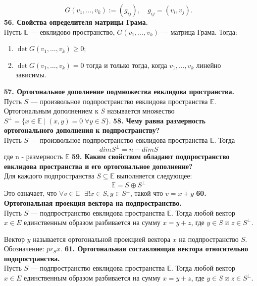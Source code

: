 \documentclass{article}
\begin{document}
	$$G(v_1,\ldots, v_k) := (g_{ij}),\quad g_{ij} = (v_i,v_j).$$
\newline
\newline
\textbf{56. Свойства определителя матрицы Грама.}\\
Пусть $\mathbb{E}$ --- евклидово пространство, $G(v_1,\ldots, v_k)$ --- матрица Грама. Тогда:
\begin{enumerate}
	\item $\det G(v_1, \ldots, v_k) \geqslant 0$;
	\item $\det G(v_1, \ldots, v_k) = 0$ тогда и только тогда, когда $v_1, \ldots, v_k$ линейно зависимы.
\end{enumerate}
\textbf{57. Ортогональное дополнение подмножества евклидова пространства.}\\
Пусть $S$ --- произвольное подпространство евклидова пространства $\mathbb{E}$. Ортогональным дополнением к $S$ называется множество $S^{\perp} = \{x\in \mathbb{E}\; |\; (x,y) = 0\;\forall y \in S\}$.
\newpage
\textbf{58. Чему равна размерность ортогонального дополнения к подпространству?}\\
Пусть $S$ --- произвольное подпространство евклидова пространства $\mathbb{E}$. Тогда
$$dimS^{\perp}=n-dimS$$
где n - размерность $\mathbb{E}$
\newline
\newline
\textbf{59. Каким свойством обладают подпространство евклидова пространства и его ортогональное дополнение?}\\
Для каждого подпространства $S \subseteq\mathbb{E}$ выполняется следующее:
$$\mathbb{E}=S\oplus S^{\perp}$$
Это означает, что $\forall v \in \mathbb{E}~~~\exists!x\in S, y \in S^{\perp}$, такой что $v = x+y$
\newline
\newline
\textbf{60. Ортогональная проекция вектора на подпространство.}\\
Пусть $S$ --- подпространство евклидова пространства $\mathbb{E}$. Тогда любой вектор $x \in E$ единственным образом разбивается на сумму $x = y + z$, где $y \in S$ и $z \in S^\perp$. 

Вектор $y$ называется ортогональной проекцией вектора $x$ на подпространство $S$. Обозначение: $pr_S x$. 
\newline
\newline
\textbf{61. Ортогональная составляющая вектора относительно подпространства.}\\
Пусть $S$ --- подпространство евклидова пространства $\mathbb{E}$. Тогда любой вектор $x \in E$ единственным образом разбивается на сумму $x = y + z$, где $y \in S$ и $z \in S^\perp$. 
\end{document}
